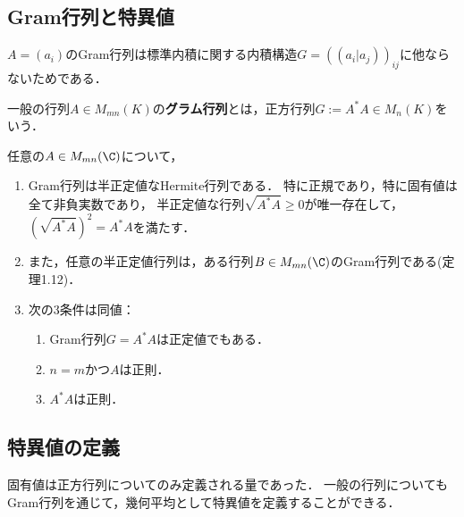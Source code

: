 \documentclass[uplatex, dvipdfmx]{jsreport}
\begin{document}
\subsection{Gram行列と特異値}

\begin{tcolorbox}[colframe=ForestGreen, colback=ForestGreen!10!white,breakable,colbacktitle=ForestGreen!40!white,coltitle=black,fonttitle=\bfseries\sffamily,
title=]
    $A=(a_i)$のGram行列は標準内積に関する内積構造$G=((a_i|a_j))_{ij}$に他ならないためである．
\end{tcolorbox}

\begin{definition}
    一般の行列$A\in M_{mn}(K)$の\textbf{グラム行列}とは，正方行列$G:=A^*A\in M_{n}(K)$をいう．
\end{definition}

\begin{proposition}[Gram行列の性質]
    任意の$A\in M_{mn}(\C)$について，
    \begin{enumerate}
        \item Gram行列は半正定値なHermite行列である．
        特に正規であり，特に固有値は全て非負実数であり，
        半正定値な行列$\sqrt{A^*A}\ge0$が唯一存在して，$(\sqrt{A^*A})^2=A^*A$を満たす．
        \item また，任意の半正定値行列は，ある行列$B\in M_{mn}(\C)$のGram行列である\cite{柳井-竹内-一般逆行列}(定理1.12)．
        \item 次の3条件は同値：
        \begin{enumerate}
            \item Gram行列$G=A^*A$は正定値でもある．
            \item $n=m$かつ$A$は正則．
            \item $A^*A$は正則．
        \end{enumerate}
    \end{enumerate}
\end{proposition}

\subsection{特異値の定義}

\begin{tcolorbox}[colframe=ForestGreen, colback=ForestGreen!10!white,breakable,colbacktitle=ForestGreen!40!white,coltitle=black,fonttitle=\bfseries\sffamily,
title=]
    固有値は正方行列についてのみ定義される量であった．
    一般の行列についてもGram行列を通じて，幾何平均として特異値を定義することができる．
\end{tcolorbox}
\end{document}
